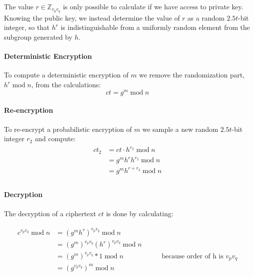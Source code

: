 \begin{definition}
    The value $r \in \mathbb{Z}_{v_pv_q}$ is only possible to calculate if we have access to private key. Knowing the public key, we instead determine the value of $r$ as a random $2.5t$-bit integer, so that $h^r$ is indistinguishable from a uniformly random element from the subgroup generated by $h$.

    \paragraph{Deterministic Encryption} To compute a deterministic encryption of $m$ we remove the randomization part, $h^r \; \textrm{mod} \; n$, from the calculations:
    \begin{equation}\label{chapter3:definition:dgk:equation:det-enc}
        ct = g^m \; \textrm{mod} \; n
    \end{equation}

    \paragraph{Re-encryption} To re-encrypt a probabilistic encryption of $m$ we sample a new random $2.5t$-bit integer $r_2$ and compute:
    \begin{align}\label{chapter3:definition:dgk:equation:re-enc}
        \begin{split}
            ct_2 &= ct \cdot h^{r_2} \; \textrm{mod} \; n \\
            &= g^mh^rh^{r_2} \; \textrm{mod} \; n \\
            &= g^mh^{r + r_2} \; \textrm{mod} \; n \\
        \end{split}
    \end{align}

    \paragraph{Decryption} The decryption of a ciphertext $ct$ is done by calculating:

    \begin{align}
        \begin{split}
            c^{v_pv_q} \; \textrm{mod} \; n &= (g^mh^r)^{v_pv_q} \; \textrm{mod} \; n \\
            &= (g^m)^{v_pv_q}(h^r)^{v_pv_q} \; \textrm{mod} \; n \\
            &= (g^m)^{v_pv_q}*1 \; \textrm{mod} \; n \;\;\;\;\;\;\;\;\;\;\;\;\;\;\;\;\;\;\;\; \text{because order of h is $v_pv_q$}\\
            &= (g^{v_pv_q})^m \; \textrm{mod} \; n
        \end{split}
    \end{align}


\end{definition}
